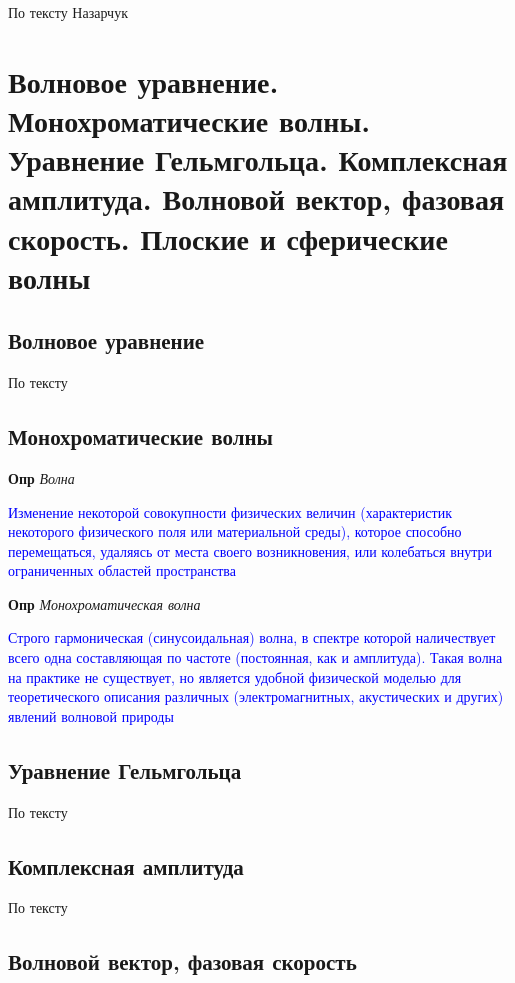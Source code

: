 \documentclass[a4paper, 14pt]{article}
\begin{document}
    По тексту Назарчук
    
    \section{Волновое уравнение.
    Монохроматические волны.
    Уравнение Гельмгольца.
    Комплексная амплитуда.
    Волновой вектор, фазовая скорость.
    Плоские и сферические волны}
    
    \subsection{Волновое уравнение}
    
    По тексту
    
    \subsection{Монохроматические волны}
    
    \textbf{Опр} \textit{Волна}
    
    \textcolor{blue}{Изменение некоторой совокупности физических величин (характеристик некоторого физического поля или
    материальной среды), которое способно перемещаться, удаляясь от места своего возникновения, или колебаться
    внутри ограниченных областей пространства}
    
    \textbf{Опр} \textit{Монохроматическая волна}
    
    \textcolor{blue}{Строго гармоническая (синусоидальная) волна, в спектре которой наличествует всего одна
    составляющая по частоте (постоянная, как и амплитуда).
    Такая волна на практике не существует, но является удобной физической моделью для теоретического описания
    различных (электромагнитных, акустических и других) явлений волновой природы}
    
    \subsection{Уравнение Гельмгольца}
    
    По тексту
    
    \subsection{Комплексная амплитуда}
    
    По тексту
    
    \subsection{Волновой вектор, фазовая скорость}
    
\end{document}
